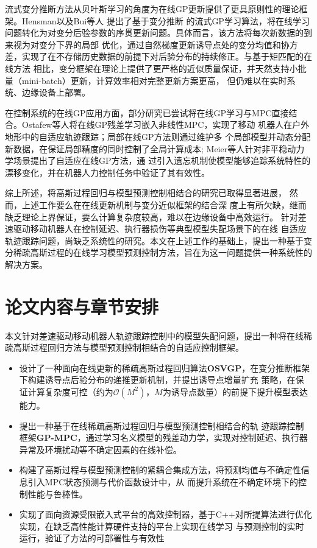 流式变分推断方法从贝叶斯学习的角度为在线GP更新提供了更具原则性的理论框架。Hensman\cite{Hensman_2015}以及Bui等人
\cite{Bui_2017_ssgp}提出了基于变分推断
的流式GP学习算法，将在线学习问题转化为对变分后验参数的序贯更新问题。具体而言，该方法将每次新数据的到来视为对变分下界的局部
优化，通过自然梯度更新诱导点处的变分均值和协方差，实现了在不存储历史数据的前提下对后验分布的持续修正。与基于矩匹配的在线方法
相比，变分框架在理论上提供了更严格的近似质量保证，并天然支持小批量（mini-batch）更新，计算效率相对完整更新方案更高，
但仍难以在实时系统、边缘设备上部署。

在控制系统的在线GP应用方面，部分研究已尝试将在线GP学习与MPC直接结合。Ostafew等人将在线GP残差学习嵌入非线性MPC，实现了移动
机器人在户外地形中的自适应轨迹跟踪\cite{ostafew2016robust_lbm_nmpc}；局部在线GP方法\cite{park_2013_lbrc}则通过维护多
个局部模型并动态分配新数据，在保证局部精度的同时控制了全局计算成本;
Meier等人\cite{Meier_2016_drift, Meier_2015_drift}针对非平稳动力学场景提出了自适应在线GP方法，通
过引入遗忘机制使模型能够追踪系统特性的漂移变化，并在机器人力控制任务中验证了其有效性。

综上所述，将高斯过程回归与模型预测控制相结合的研究已取得显著进展，
然而，上述工作要么在在线更新机制与变分近似框架的结合深
度上有所欠缺，继而缺乏理论上界保证，要么计算复杂度较高，难以在边缘设备中高效运行。
针对差速驱动移动机器人在控制延迟、执行器损伤等典型模型失配场景下的在线
自适应轨迹跟踪问题，尚缺乏系统性的研究。本文在上述工作的基础上，提出一种基于变分稀疏高斯过程的在线学习模型预测控制方法，旨在为这一问题提供一种系统性的解决方案。

\section{论文内容与章节安排}
本文针对差速驱动移动机器人轨迹跟踪控制中的模型失配问题，提出一种将在线稀疏高斯过程回归方法与模型预测控制相结合的自适应控制框架。

\begin{itemize}
    \item 设计了一种面向在线更新的稀疏高斯过程回归算法\textbf{OSVGP}，在变分推断框架下构建诱导点后验分布的递推更新机制，并提出诱导点增量扩充
    策略，在保证计算复杂度可控（约为$\mathcal{O}(M^2)$，$M$为诱导点数量）的前提下提升模型表达能力。
    \item 提出一种基于在线稀疏高斯过程回归与模型预测控制相结合的轨
    迹跟踪控制框架\textbf{GP-MPC}，通过学习名义模型的残差动力学，实现对控制延迟、执行器异常及环境扰动等不确定因素的在线补偿。
    \item 构建了高斯过程与模型预测控制的紧耦合集成方法，将预测均值与不确定性信息引入MPC状态预测与代价函数设计中，从
    而提升系统在不确定环境下的控制性能与鲁棒性。
    \item 实现了面向资源受限嵌入式平台的高效控制器，基于C++对所提算法进行优化实现，在缺乏高性能计算硬件支持的平台上实现在线学习
    与预测控制的实时运行，验证了方法的可部署性与有效性
\end{itemize}

